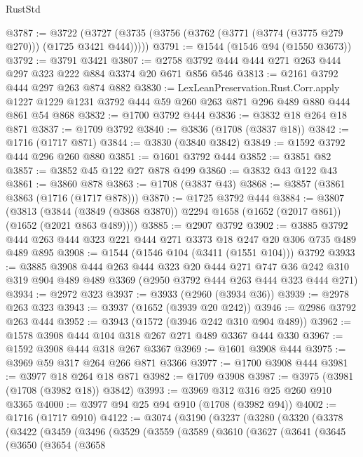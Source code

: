 \begin{lexlean}{RustStd}
\begin{coremodule}
{\begin{coremodule}
{{{{{{{{{{{@3787 := @3722 (@3727 (@3735 (@3756 (@3762 (@3771 (@3774 (@3775 @279 @270))) (@1725 @3421 @444)))))
@3791 := @1544 (@1546 @94 (@1550 @3673))
@3792 := @3791 @3421
@3807 := @2758 @3792 @444 @444 @271 @263 @444 @297 @323 @222 @884 @3374 @20 @671 @856 @546
@3813 := @2161 @3792 @444 @297 @263 @874 @882
@3830 := LexLeanPreservation.Rust.Corr.apply
    @1227
    @1229
    @1231
    @3792
    @444
    @59
    @260
    @263
    @871
    @296
    @489
    @880
    @444
    @861
    @54
    @868
@3832 := @1700 @3792 @444
@3836 := @3832 @18 @264 @18 @871
@3837 := @1709 @3792
@3840 := @3836 (@1708 (@3837 @18))
@3842 := @1716 (@1717 @871)
@3844 := @3830 (@3840 @3842)
@3849 := @1592 @3792 @444 @296 @260 @880
@3851 := @1601 @3792 @444
@3852 := @3851 @82
@3857 := @3852 @45 @122 @27 @878 @499
@3860 := @3832 @43 @122 @43
@3861 := @3860 @878
@3863 := @1708 (@3837 @43)
@3868 := @3857 (@3861 @3863 (@1716 (@1717 @878)))
@3870 := @1725 @3792 @444
@3884 := @3807
    (@3813 (@3844 (@3849 (@3868 @3870)) @2294 @1658 (@1652 (@2017 @861)) (@1652 (@2021 @863 @489))))
@3885 := @2907 @3792
@3902 := @3885 @3792 @444 @263 @444 @323 @221 @444 @271 @3373 @18 @247 @20 @306 @735 @489 @489 @895
@3908 := @1544 (@1546 @104 (@3411 (@1551 @104))) @3792
@3933 := @3885
    @3908
    @444
    @263
    @444
    @323
    @20
    @444
    @271
    @747
    @36
    @242
    @310
    @319
    @904
    @489
    @489
    @3369
    (@2950 @3792 @444 @263 @444 @323 @444 @271)
@3934 := @2972 @323
@3937 := @3933 (@2960 (@3934 @36))
@3939 := @2978 @263 @323
@3943 := @3937 (@1652 (@3939 @20 @242))
@3946 := @2986 @3792 @263 @444
@3952 := @3943 (@1572 (@3946 @242 @310 @904 @489))
@3962 := @1578 @3908 @444 @104 @318 @267 @271 @489 @3367 @444 @330
@3967 := @1592 @3908 @444 @318 @267 @3367
@3969 := @1601 @3908 @444
@3975 := @3969 @59 @317 @264 @266 @871 @3366
@3977 := @1700 @3908 @444
@3981 := @3977 @18 @264 @18 @871
@3982 := @1709 @3908
@3987 := @3975 (@3981 (@1708 (@3982 @18)) @3842)
@3993 := @3969 @312 @316 @25 @260 @910 @3365
@4000 := @3977 @94 @25 @94 @910 (@1708 (@3982 @94))
@4002 := @1716 (@1717 @910)
@4122 := @3074
    (@3190
      (@3237
        (@3280
          (@3320
            (@3378
              (@3422
                (@3459
                  (@3496
                    (@3529
                      (@3559
                        (@3589
                          (@3610
                            (@3627
                              (@3641
                                (@3645
                                  (@3650
                                    (@3654
                                      (@3658
}}}}}}}}}}}
\end{coremodule}}
\end{coremodule}
\end{lexlean}
